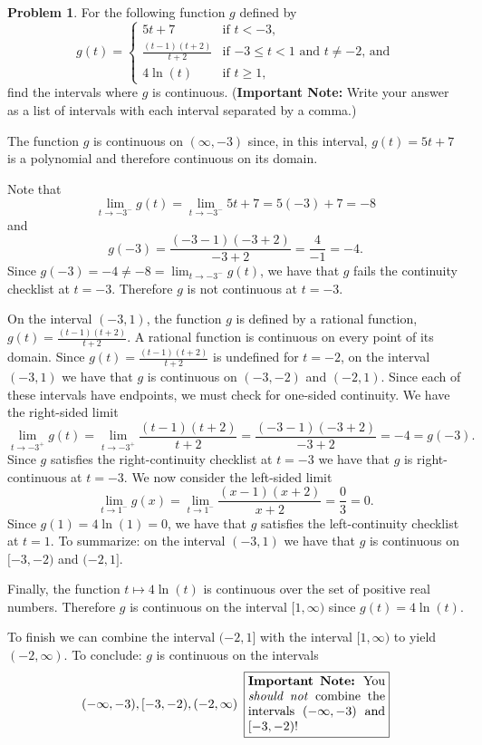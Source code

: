 \documentclass{article}
\theoremstyle{definition}
\newtheorem{Problem}{Problem}
\begin{document}
\begin{Problem}
  For the following function $g$ defined by
  \[
    g(t) =
    \begin{cases}
      5t + 7 & \mbox{if $t < -3$,}\\
      \displaystyle\frac{(t-1)(t+2)}{t+2} & \mbox{if $-3 \leq t < 1$ and $t \neq -2$, and}\\
      4 \ln(t) & \mbox{if $t \geq 1$,}
    \end{cases}
  \]
  find the intervals where $g$ is continuous.
  (\textbf{Important Note:} Write your answer as a list of intervals with each interval separated by a comma.)
\end{Problem}
\begin{Solution}
  The function $g$ is continuous on $(\infty, -3)$ since, in this interval, $g(t)=5t+7$ is a polynomial and therefore continuous on its domain.
  
  Note that
  \[
    \lim_{t \to -3^-} g(t) = \lim_{t \to -3^-} 5t+7 = 5(-3) + 7 = -8
  \]
  and
  \[
    g(-3) = \frac{(-3-1)(-3+2)}{-3+2} = \frac{4}{-1} = -4.
  \]
  Since $g(-3) = -4 \ne -8 = \lim_{t \to -3^-} g(t)$, we have that $g$ fails the continuity checklist at $t = -3$.
  Therefore $g$ is not continuous at $t = -3$.

  On the interval $(-3, 1)$, the function $g$ is defined by a rational function, $g(t) = \frac{(t-1)(t+2)}{t+2}$.
  A rational function is continuous on every point of its domain.
  Since $g(t) = \frac{(t-1)(t+2)}{t+2}$ is undefined for $t = -2$, on the interval $(-3, 1)$ we have that $g$ is continuous on $(-3, -2)$ and $(-2, 1)$.
  Since each of these intervals have endpoints, we must check for one-sided continuity.
  We have the right-sided limit
  \[
    \lim_{t \to -3^+} g(t) = \lim_{t \to -3^+} \frac{(t-1)(t+2)}{t+2} = \frac{(-3-1)(-3+2)}{-3+2} = -4 = g(-3).
  \]
  Since $g$ satisfies the right-continuity checklist at $t = -3$ we have that $g$ is right-continuous at $t = -3$.
  We now consider the left-sided limit
  \[
    \lim_{t \to 1^-} g(x) = \lim_{t \to 1^-} \frac{(x-1)(x+2)}{x+2} = \frac{0}{3} = 0.
  \]
  Since $g(1) = 4 \ln(1) = 0$, we have that $g$ satisfies the left-continuity checklist at $t = 1$.
  To summarize: on the interval $(-3, 1)$ we have that $g$ is continuous on $[-3, -2)$ and $(-2, 1]$.

  Finally, the function $t \mapsto 4 \ln(t)$ is continuous over the set of positive real numbers.
  Therefore $g$ is continuous on the interval $[1, \infty)$ since $g(t) = 4 \ln(t)$.

  To finish we can combine the interval $(-2, 1]$ with the interval $[1, \infty)$ to yield $(-2, \infty)$.
  To conclude: $g$ is continuous on the intervals \[(-\infty, -3), [-3, -2), (-2, \infty)\hspace{0.5em}\fbox{\parbox[c][]{1.5in}{\textbf{Important Note:} You \emph{should not} combine the intervals $(-\infty, -3)$ and $[-3, -2)$!}}\]
\end{Solution}
\end{document}
